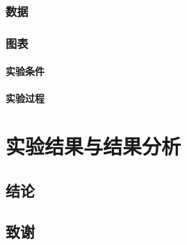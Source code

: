 \documentclass{ctexbook} %
\begin{document}
	\subsection{数据}
	\subsection{图表}
	\subsubsection{ 实验条件 }
	\subsubsection{实验过程} 
	\chapter{实验结果与结果分析}
	
	\section{结论 }
	
	\section{致谢 }
	
	
\end{document}
